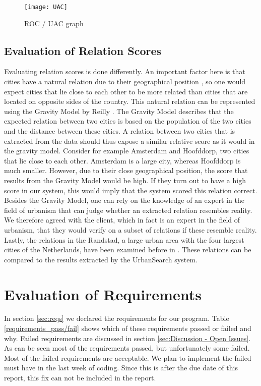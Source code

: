 \begin{figure}[ht]
\centering
\texttt{[image: UAC]}
\caption{ROC / UAC graph \protect\footnotemark{}}
\label{fig:UAC}
\end{figure}

\subsection{Evaluation of Relation Scores} \label{sec:validation_protocol}
Evaluating relation scores is done differently. An important factor here is that cities have a natural relation due to their geographical position \cite{tobler1970computer}, so one would expect cities that lie close to each other to be more related than cities that are located on opposite sides of the country. This natural relation can be represented using the Gravity Model by Reilly \cite{reilly1931law}. The Gravity Model describes that the expected relation between two cities is based on the population of the two cities and the distance between these cities. A relation between two cities that is extracted from the data should thus expose a similar relative score as it would in the gravity model. Consider for example Amsterdam and Hoofddorp, two cities that lie close to each other. Amsterdam is a large city, whereas Hoofddorp is much smaller. However, due to their close geographical position, the score that results from the Gravity Model would be high. If they turn out to have a high score in our system, this would imply that the system scored this relation correct. Besides the Gravity Model, one can rely on the knowledge of an expert in the field of urbanism that can judge whether an extracted relation resembles reality. We therefore agreed with the client, which in fact is an expert in the field of urbanism, that they would verify on a subset of relations if these resemble reality. Lastly, the relations in the Randstad, a large urban area with the four largest cities of the Netherlands, have been examined before in \cite{van2010economic}. These relations can be compared to the results extracted by the  UrbanSearch system.

\section{Evaluation of Requirements}
In section \ref{sec:reqs} we declared the requirements for our program. Table \ref{requirements_pass/fail} shows which of these requirements passed or failed and why. Failed requirements are discussed in section \ref{sec:Discussion - Open Issues}. As can be seen most of the requirements passed, but unfortunately some failed. Most of the failed requirements are acceptable. We plan to implement the failed must have in the last week of coding. Since this is after the due date of this report, this fix can not be included in the report.\\

